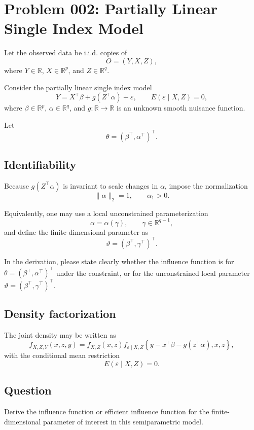 \documentclass{article}
\begin{document}
\section*{Problem 002: Partially Linear Single Index Model}

Let the observed data be i.i.d. copies of
\[
O=(Y,X,Z),
\]
where \(Y\in\mathbb R\), \(X\in\mathbb R^p\), and \(Z\in\mathbb R^q\).

Consider the partially linear single index model
\[
Y = X^\top \beta + g(Z^\top \alpha) + \varepsilon,
\qquad
E(\varepsilon\mid X,Z)=0,
\]
where \(\beta\in\mathbb R^p\), \(\alpha\in\mathbb R^q\), and
\(g:\mathbb R\to\mathbb R\) is an unknown smooth nuisance function.

Let
\[
\theta=(\beta^\top,\alpha^\top)^\top.
\]

\subsection*{Identifiability}

Because \(g(Z^\top\alpha)\) is invariant to scale changes in \(\alpha\), impose
the normalization
\[
\|\alpha\|_2=1,
\qquad
\alpha_1>0.
\]

Equivalently, one may use a local unconstrained parameterization
\[
\alpha=\alpha(\gamma),
\qquad
\gamma\in\mathbb R^{q-1},
\]
and define the finite-dimensional parameter as
\[
\vartheta=(\beta^\top,\gamma^\top)^\top.
\]

In the derivation, please state clearly whether the influence function is for
\(\theta=(\beta^\top,\alpha^\top)^\top\) under the constraint, or for the
unconstrained local parameter \(\vartheta=(\beta^\top,\gamma^\top)^\top\).

\subsection*{Density factorization}

The joint density may be written as
\[
f_{X,Z,Y}(x,z,y)
=
f_{X,Z}(x,z)
f_{\varepsilon\mid X,Z}
\left\{
y-x^\top\beta-g(z^\top\alpha),x,z
\right\},
\]
with the conditional mean restriction
\[
E(\varepsilon\mid X,Z)=0.
\]

\subsection*{Question}

Derive the influence function or efficient influence function for the
finite-dimensional parameter of interest in this semiparametric model.
\end{document}
